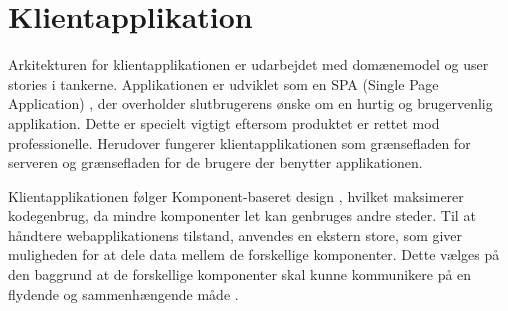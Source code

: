 \newpage
\section{Klientapplikation}

Arkitekturen for klientapplikationen er udarbejdet med domænemodel \cite[Domænemodel]{converge-terms} og user stories i tankerne. Applikationen er udviklet som en SPA (Single Page Application) \cite[SPA]{converge-terms}, der overholder slutbrugerens ønske om en hurtig og brugervenlig applikation. Dette er specielt vigtigt eftersom produktet er rettet mod professionelle. Herudover fungerer klientapplikationen som grænsefladen for serveren og grænsefladen for de brugere der benytter applikationen.

Klientapplikationen følger Komponent-baseret design \cite[Komponent-baseret design]{converge-terms}, hvilket maksimerer kodegenbrug, da mindre komponenter let kan genbruges andre steder. Til at håndtere webapplikationens tilstand, anvendes en ekstern store, som giver muligheden for at dele data mellem de forskellige komponenter. Dette vælges på den baggrund at de forskellige komponenter skal kunne kommunikere på en flydende og sammenhængende måde \cite{software-architecture}.
